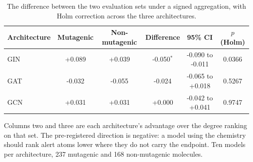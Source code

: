\begin{table}[htbp]
\centering
\caption{The difference between the two evaluation sets under a signed aggregation, with Holm correction across the three architectures.}
\label{tab:dod}
\footnotesize
\setlength{\tabcolsep}{4pt}
\begin{tabular}{lccccc}
\toprule
Architecture & Mutagenic & Non-mutagenic & Difference & 95\% CI & $p$ (Holm) \\
\midrule
GIN & +0.089 & +0.039 & -0.050$^{*}$ & -0.090 to -0.011 & 0.0366 \\
GAT & -0.032 & -0.055 & -0.024 & -0.065 to +0.018 & 0.5267 \\
GCN & +0.031 & +0.031 & +0.000 & -0.042 to +0.041 & 0.9747 \\
\bottomrule
\end{tabular}
\begin{flushleft}\footnotesize Columns two and three are each architecture's advantage over the degree ranking on that set. The pre-registered direction is negative: a model using the chemistry should rank alert atoms lower where they do not carry the endpoint. Ten models per architecture, 237 mutagenic and 168 non-mutagenic molecules.\end{flushleft}
\end{table}
